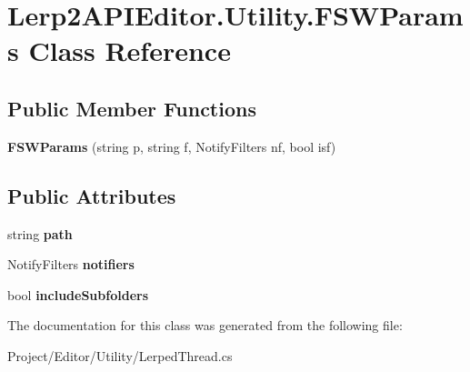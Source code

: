 \hypertarget{class_lerp2_a_p_i_editor_1_1_utility_1_1_f_s_w_params}{}\section{Lerp2\+A\+P\+I\+Editor.\+Utility.\+F\+S\+W\+Params Class Reference}
\label{class_lerp2_a_p_i_editor_1_1_utility_1_1_f_s_w_params}
\subsection*{Public Member Functions}
\begin{DoxyCompactItemize}
\item 
\mbox{\label{class_lerp2_a_p_i_editor_1_1_utility_1_1_f_s_w_params_a5d78516efbcf0fd0e6a8d9f39d0f2dc3}} 
{\bfseries F\+S\+W\+Params} (string p, string f, Notify\+Filters nf, bool isf)
\end{DoxyCompactItemize}
\subsection*{Public Attributes}
\begin{DoxyCompactItemize}
\item 
\mbox{\label{class_lerp2_a_p_i_editor_1_1_utility_1_1_f_s_w_params_ada2e0ac36c5889a9651938f2c5666f49}} 
string {\bfseries path}
\item 
\mbox{\label{class_lerp2_a_p_i_editor_1_1_utility_1_1_f_s_w_params_a1a773e1650813f529e34db2ed0864647}} 
Notify\+Filters {\bfseries notifiers}
\item 
\mbox{\label{class_lerp2_a_p_i_editor_1_1_utility_1_1_f_s_w_params_a1d968e39947e0de9cfcab29bbd30a510}} 
bool {\bfseries include\+Subfolders}
\end{DoxyCompactItemize}


The documentation for this class was generated from the following file\+:\begin{DoxyCompactItemize}
\item 
Project/\+Editor/\+Utility/Lerped\+Thread.\+cs\end{DoxyCompactItemize}
